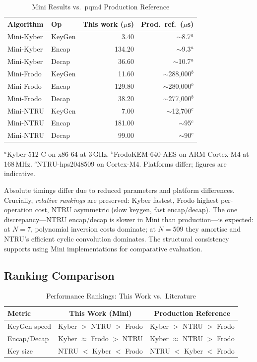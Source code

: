 \documentclass[11pt,a4paper]{article}
\begin{document}
\begin{table}[H]
\centering\small
\caption{Mini Results vs.\ pqm4 Production Reference \cite{pqm4}}
\label{tab:nist-comparison}
\begin{tabular}{llrr}
\toprule
\textbf{Algorithm} & \textbf{Op} & \textbf{This work ($\mu$s)} & \textbf{Prod.\ ref.\ ($\mu$s)} \\
\midrule
Mini-Kyber & KeyGen & 3.40 & $\sim$8.7$^{a}$ \\
Mini-Kyber & Encap  & 134.20 & $\sim$9.3$^{a}$ \\
Mini-Kyber & Decap  & 36.60  & $\sim$10.7$^{a}$ \\
\midrule
Mini-Frodo & KeyGen & 11.60 & $\sim$288{,}000$^{b}$ \\
Mini-Frodo & Encap  & 129.80 & $\sim$280{,}000$^{b}$ \\
Mini-Frodo & Decap  & 38.20  & $\sim$277{,}000$^{b}$ \\
\midrule
Mini-NTRU  & KeyGen & 7.00   & $\sim$12{,}700$^{c}$ \\
Mini-NTRU  & Encap  & 181.00 & $\sim$95$^{c}$ \\
Mini-NTRU  & Decap  & 99.00  & $\sim$90$^{c}$ \\
\bottomrule
\end{tabular}
\vspace{0.2em}

\footnotesize{$^{a}$Kyber-512 C on x86-64 at 3\,GHz. $^{b}$FrodoKEM-640-AES on ARM Cortex-M4 at 168\,MHz. $^{c}$NTRU-hps2048509 on Cortex-M4. Platforms differ; figures are indicative.}
\end{table}

Absolute timings differ due to reduced parameters and platform differences. Crucially, \emph{relative rankings} are preserved: Kyber fastest, Frodo highest per-operation cost, NTRU asymmetric (slow keygen, fast encap/decap). The one discrepancy---NTRU encap/decap is slower in Mini than production---is expected: at $N=7$, polynomial inversion costs dominate; at $N=509$ they amortise and NTRU's efficient cyclic convolution dominates. The structural consistency supports using Mini implementations for comparative evaluation.

\subsection{Ranking Comparison}

\begin{table}[H]
\centering\small
\caption{Performance Rankings: This Work vs.\ Literature \cite{nist2024,pqm4}}
\label{tab:ranking-comparison}
\begin{tabular}{l|c|c}
\toprule
\textbf{Metric} & \textbf{This Work (Mini)} & \textbf{Production Reference} \\
\midrule
KeyGen speed  & Kyber $>$ NTRU $>$ Frodo & Kyber $>$ NTRU $>$ Frodo \\
Encap/Decap   & Kyber $\approx$ Frodo $>$ NTRU & Kyber $\approx$ NTRU $>$ Frodo \\
Key size      & NTRU $<$ Kyber $<$ Frodo & NTRU $<$ Kyber $<$ Frodo \\
\bottomrule
\end{tabular}
\end{table}
\end{document}
